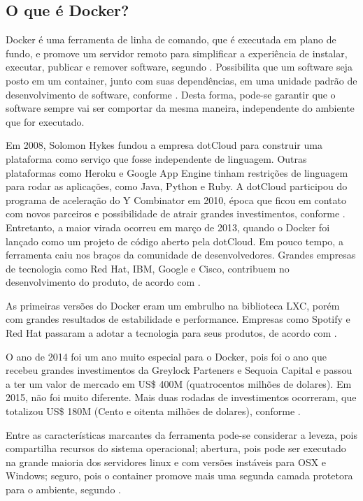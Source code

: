 \documentclass[
	12pt,				%
	openright,			%
	oneside,			%
	a4paper,			%
	chapter=TITLE,		%
	section=TITLE,		%
	english,			%
	french,				%
	spanish,			%
	brazil				%
	]{abntex2}
\begin{document}
\subsection{O que é Docker?}

Docker é uma ferramenta de linha de comando, que é executada em plano de fundo, e promove um servidor remoto para simplificar a experiência de instalar, executar, publicar e remover software, segundo . Possibilita que um software seja posto em um container, junto com suas dependências, em uma unidade padrão de desenvolvimento de software, conforme . Desta forma, pode-se garantir que o software sempre vai ser comportar da mesma maneira, independente do ambiente que for executado.

Em 2008, Solomon Hykes fundou a empresa dotCloud para construir uma plataforma como serviço que fosse independente de linguagem. Outras plataformas como Heroku e Google App Engine tinham restrições de linguagem para rodar as aplicações, como Java, Python e Ruby. A dotCloud participou do programa de aceleração do Y Combinator em 2010, época que ficou em contato com novos parceiros e possibilidade de atrair grandes investimentos, conforme . Entretanto, a maior virada ocorreu em março de 2013, quando o Docker foi lançado como um projeto de código aberto pela dotCloud. Em pouco tempo, a ferramenta caiu nos braços da comunidade de desenvolvedores. Grandes empresas de tecnologia como Red Hat, IBM, Google e Cisco, contribuem no desenvolvimento do produto, de acordo com .

As primeiras versões do Docker eram um embrulho na biblioteca LXC, porém com grandes resultados de estabilidade e performance. Empresas como Spotify e Red Hat passaram a adotar a tecnologia para seus produtos, de acordo com .

O ano de 2014 foi um ano muito especial para o Docker, pois foi o ano que recebeu grandes investimentos da Greylock Parteners e Sequoia Capital e passou a ter um valor de mercado em US\$ 400M (quatrocentos milhões de dolares). Em 2015, não foi muito diferente. Mais duas rodadas de investimentos ocorreram, que totalizou US\$ 180M (Cento e oitenta milhões de dolares), conforme  . 

Entre as características marcantes da ferramenta pode-se considerar a leveza, pois compartilha recursos do sistema operacional; abertura, pois pode ser executado na grande maioria dos servidores linux e com versões instáveis para OSX e Windows; seguro, pois o container promove mais uma segunda camada protetora para o ambiente, segundo .
\end{document}
